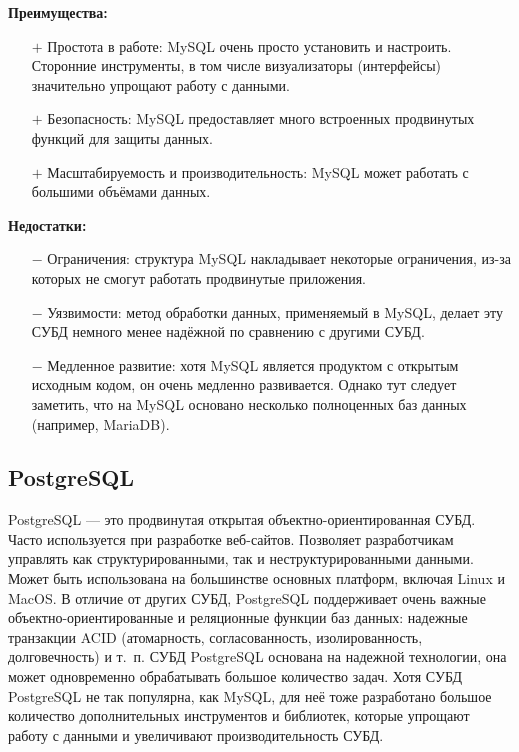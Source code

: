 \textbf{Преимущества:}
\begin{itemize}
	\item[$+$] Простота в работе: MySQL очень просто установить и настроить.
	Сторонние инструменты, в том числе визуализаторы (интерфейсы) значительно упрощают работу с данными.
	\item[$+$] Безопасность: MySQL предоставляет много встроенных продвинутых функций для защиты данных.
	\item[$+$] Масштабируемость и производительность: MySQL может работать с большими объёмами данных.
\end{itemize}

\textbf{Недостатки:}
\begin{itemize}
	\item[$-$] Ограничения: структура MySQL накладывает некоторые ограничения, из-за которых не смогут работать продвинутые приложения.
	\item[$-$] Уязвимости: метод обработки данных, применяемый в MySQL, делает эту СУБД немного менее надёжной по сравнению с другими СУБД.
	\item[$-$] Медленное развитие: хотя MySQL является продуктом с открытым исходным кодом, он очень медленно развивается.
	Однако тут следует заметить, что на MySQL основано несколько полноценных баз данных (например, MariaDB).
\end{itemize}

\subsection{PostgreSQL}

PostgreSQL — это продвинутая открытая объектно-ориентированная СУБД.
Часто используется при разработке веб-сайтов.
Позволяет разработчикам управлять как структурированными, так и неструктурированными данными.
Может быть использована на большинстве основных платформ, включая Linux и MacOS.
В отличие от других СУБД, PostgreSQL поддерживает очень важные объектно-ориентированные и реляционные функции баз данных: надежные транзакции ACID (атомарность, согласованность, изолированность, долговечность) \cite{postgresql} и т.~п.
СУБД PostgreSQL основана на надежной технологии, она может одновременно обрабатывать большое количество задач.
Хотя СУБД PostgreSQL не так популярна, как MySQL, для неё тоже разработано большое количество дополнительных инструментов и библиотек, которые упрощают работу с данными и увеличивают производительность СУБД.

